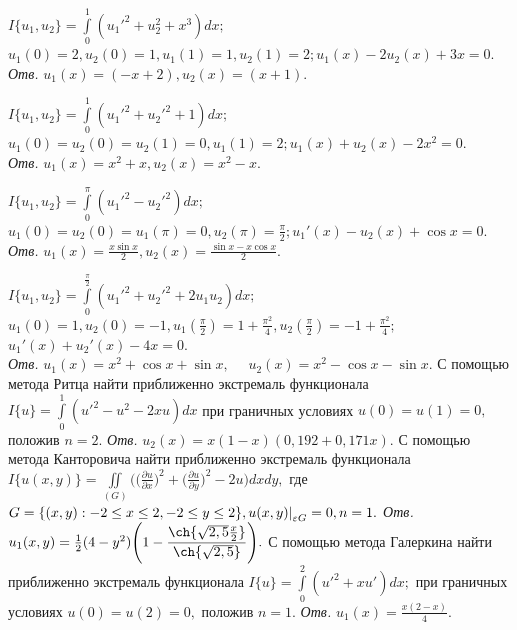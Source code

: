 	\zadanie
	$I\{u_1,u_2\}=\int\limits_0^1 (u_1'^2+u_2^2+x^3)dx;$\\
	$u_1(0)=2, u_2(0)=1, u_1(1)=1, u_2(1)=2;u_1(x)-2u_2(x)+3x=0.$\\
	{\it Отв.} $u_1(x)=(-x+2), u_2(x)=(x+1).$

	\zadanie
	$I\{u_1,u_2\}=\int\limits_0^1 (u_1'^2+u_2'^2+1)dx;$\\
	$u_1(0)=u_2(0)=u_2(1)=0, u_1(1)=2;u_1(x)+u_2(x)-2x^2=0.$\\
  	{\it Отв.} $u_1(x)=x^2+x, u_2(x)=x^2-x.$

	\zadanie
	$I\{u_1,u_2\}=\int\limits_0^\pi (u_1'^2-u_2'^2)dx;$\\
	$u_1(0)=u_2(0)=u_1(\pi)=0, u_2(\pi)=\frac{\pi}{2};u_1'(x)-u_2(x)+\cos{x}=0.$\\

	\noindent
	{\it Отв.} $u_1(x)=\frac{x\sin{x}}{2}, u_2(x)=\frac{\sin{x}-x\cos{x}}{2}.$

	\zadanie
		$I\{u_1,u_2\}=\int\limits_0^\frac{\pi}{2} (u_1'^2+u_2'^2+2u_1u_2)dx;$\\
		$u_1(0)=1, u_2(0)=-1, u_1(\frac{\pi}{2})=1+\frac{\pi^2}{4}, u_2(\frac{\pi}{2})=-1+\frac{\pi^2}{4};$\\
		$u_1'(x)+u_2'(x)-4x=0.$\\
		{\it Отв.} $u_1(x)=x^2 +\cos{x}+\sin{x},$ \, \, $u_2(x)=x^2 -\cos{x}-\sin{x}.$
	\vspace{2mm}
	\zadanie
	С помощью метода Ритца найти приближенно экстремаль функционала $I\{u\}= \int\limits_0^1 (u'^2-u^2-2xu)dx$ при граничных условиях $u(0)=u(1)=0,$ положив $n=2$. {\it Отв.} $u_2(x)=x(1-x)(0,192+0,171x).$
	\vspace{2mm}
	\zadanie
	С помощью метода Канторовича найти приближенно экстремаль функционала $I\{u(x,y)\}= \iint\limits_{(G)} \displaystyle \Bigg(\Big(\frac{\partial u}{\partial x}\Big)^2 + \Big(\frac{\partial u}{\partial y}\Big)^2-2u\Bigg)dxdy,$ где $G=\{(x,y):\hfill -2\le x\le 2, \hfill -2\le y\le 2\}, \hfill {u(x,y)|}_{\varepsilon G}=0, \hfill n = 1.$
	{\it Отв.} $u_1(x,y) = \frac{1}{2}(4-y^2)\Bigg(1 - \displaystyle \frac{\ch{\sqrt{2,5}\frac{x}{2}}}{\ch{\sqrt{2,5}}}\Bigg).$
	\vspace{2mm}
	\zadanie
	С помощью метода Галеркина найти приближенно экстремаль функционала $I\{u\}=\int\limits_0^2 (u'^2+xu')dx;$ при граничных условиях $u(0)=u(2)=0,$ положив $n=1$. {\it Отв.} $u_1(x)=\frac{x(2-x)}{4}.$
